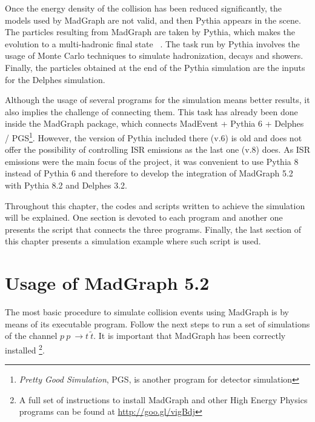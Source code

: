 \documentclass[12pt, oneside]{book}              %
\begin{document}
Once the energy density of the collision has been reduced significantly, the models used
by MadGraph are not valid, and then Pythia appears in the scene. The particles resulting
from MadGraph are taken by Pythia, which makes the evolution to a multi-hadronic final
state ~\cite{Sjostrand:2014zea}. The task run by Pythia involves the usage of Monte
Carlo techniques to simulate hadronization, decays and showers. Finally, the particles
obtained at the end of the Pythia simulation are the inputs for the Delphes simulation.

Although the usage of several programs for the simulation means better results, it also
implies the challenge of connecting them. This task has already been done inside the MadGraph
package, which connects MadEvent + Pythia 6 + Delphes / PGS\footnote{\textit{Pretty 
Good Simulation}, PGS, is another program for detector simulation}. However, the version
of Pythia included there (v.6) is old and does not offer the possibility of controlling 
ISR emissions as the last one (v.8) does. As ISR emissions were the main focus of the 
project, it was convenient to use Pythia 8 instead of Pythia 6 and therefore to develop
the integration of MadGraph 5.2 with Pythia 8.2 and Delphes 3.2.

Throughout this chapter, the codes and scripts written to achieve the simulation will
be explained. One section is devoted to each program and another one presents the
script that connects the three programs. Finally, the last section of this chapter
presents a simulation example where such script is used.

\section{Usage of MadGraph 5.2} \label{sec:MadGraph}

The most basic procedure to simulate collision events using MadGraph is by means of its
executable program. Follow the next steps to run a set of simulations of the channel
$ p\ p\ \to t\ \tilde{t} $. It is important that MadGraph has been correctly installed
\footnote{A full set of instructions to install MadGraph and other High Energy Physics
programs can be found at \url{http://goo.gl/vigBdj}}.
\end{document}
